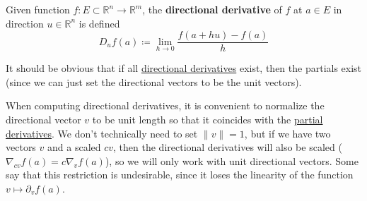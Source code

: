 	\begin{definition}
	  \label{def:directional-derivative}
		Given function $f: E \subset \mathbb{R}^n \to \mathbb{R}^m$, the \textbf{directional derivative} of $f$ at $a \in E$ in direction $u \in \mathbb{R}^n$ is defined 
		\begin{equation}
			D_u f(a) \coloneqq \lim_{h \to 0} \frac{f(a + hu) - f(a)}{h} 
		\end{equation}
	\end{definition}

	It should be obvious that if all \hyperref[def:directional-derivative]{directional derivatives} exist, then the partials exist (since we can just set the directional vectors to be the unit vectors). 

	When computing directional derivatives, it is convenient to normalize the directional vector $v$ to be unit length so that it coincides with the \hyperref[def:partial-derivative]{partial derivatives}. We don't technically need to set $\|v\| = 1$, but if we have two vectors $v$ and a scaled $c v$, then the directional derivatives will also be scaled ($\nabla_{c v} f (a) = c \nabla_{v} f (a)$), so we will only work with unit directional vectors. Some say that this restriction is undesirable, since it loses the linearity of the function $v \mapsto \partial_v f (a)$. 


